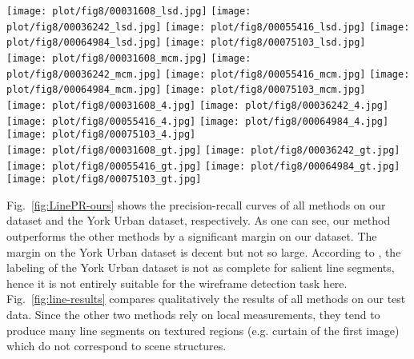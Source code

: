 \documentclass[10pt,twocolumn,letterpaper]{article}
\begin{document}
\begin{figure*}[t!]
\centering
\texttt{[image: plot/fig8/00031608\_lsd.jpg]}
\texttt{[image: plot/fig8/00036242\_lsd.jpg]}
\texttt{[image: plot/fig8/00055416\_lsd.jpg]}
\texttt{[image: plot/fig8/00064984\_lsd.jpg]}
\texttt{[image: plot/fig8/00075103\_lsd.jpg]}
\\
\texttt{[image: plot/fig8/00031608\_mcm.jpg]}
\texttt{[image: plot/fig8/00036242\_mcm.jpg]}
\texttt{[image: plot/fig8/00055416\_mcm.jpg]}
\texttt{[image: plot/fig8/00064984\_mcm.jpg]}
\texttt{[image: plot/fig8/00075103\_mcm.jpg]}
\\
\texttt{[image: plot/fig8/00031608\_4.jpg]}
\texttt{[image: plot/fig8/00036242\_4.jpg]}
\texttt{[image: plot/fig8/00055416\_4.jpg]}
\texttt{[image: plot/fig8/00064984\_4.jpg]}
\texttt{[image: plot/fig8/00075103\_4.jpg]}
\\
\texttt{[image: plot/fig8/00031608\_gt.jpg]}
\texttt{[image: plot/fig8/00036242\_gt.jpg]}
\texttt{[image: plot/fig8/00055416\_gt.jpg]}
\texttt{[image: plot/fig8/00064984\_gt.jpg]}
\texttt{[image: plot/fig8/00075103\_gt.jpg]}
\\
\caption{Line/wireframe detection results. {\bf First row:} LSD (-(NFA)  ). {\bf Second row:} MCMLSD (confidence top 100). {\bf Third row:} Our method (line heat map ). {\bf Fourth row:} Ground truth.}\vspace{-4mm}
\label{fig:line-results}
\end{figure*}


 Fig.~\ref{fig:LinePR-ours} shows the precision-recall curves of all methods on our dataset and the York Urban dataset, respectively. As one can see, our method outperforms the other methods by a significant margin on our dataset. The margin on the York Urban dataset is decent but not so large. According to \cite{Almazan17}, the labeling of the York Urban dataset is not as complete for salient line segments, hence it is not entirely suitable for the wireframe detection task here.  Fig.~\ref{fig:line-results} compares qualitatively the results of all methods on our test data. Since the other two methods rely on local measurements, they tend to produce many line segments on textured regions (e.g. curtain of the first image) which do not correspond to scene structures.
\end{document}

